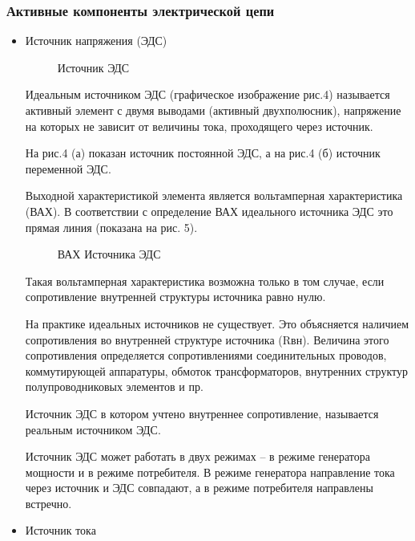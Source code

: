 \subsubsection{Активные компоненты электрической цепи}
\begin{itemize}
\item Источник напряжения (ЭДС)
\begin{center}
	\begin{figure}[h!]
		\caption{ Источник ЭДС}	
	\end{figure}
\end{center}

	Идеальным источником ЭДС (графическое изображение рис.4) называется активный элемент с двумя выводами (активный двухполюсник), напряжение на которых не зависит от величины тока, проходящего через источник.

	На рис.4 (а) показан источник постоянной ЭДС, а на рис.4 (б) источник переменной ЭДС.

	Выходной характеристикой элемента является вольтамперная характеристика (ВАХ). В соответствии с определение ВАХ идеального источника ЭДС это прямая линия (показана на рис. 5).
\begin{center}
	\begin{figure}[h!]
		\caption{ ВАХ Источника ЭДС}	
	\end{figure}
\end{center}
	Такая вольтамперная характеристика возможна только в том случае, если сопротивление внутренней структуры источника равно нулю.
	
	На практике идеальных источников не существует. Это объясняется наличием сопротивления во внутренней структуре источника (Rвн). Величина этого сопротивления определяется сопротивлениями соединительных проводов, коммутирующей аппаратуры, обмоток трансформаторов, внутренних структур полупроводниковых элементов и пр.

	Источник ЭДС в котором учтено внутреннее сопротивление, называется реальным источником ЭДС.

	Источник ЭДС может работать в двух режимах – в режиме генератора мощности и в режиме потребителя. В режиме генератора направление тока через источник и ЭДС совпадают, а в режиме потребителя направлены встречно.

\item Источник тока
	

\end{itemize}
